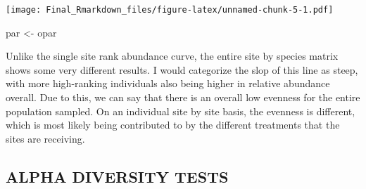 \documentclass[
]{article}
\newenvironment{Shaded}{\begin{snugshade}}{\end{snugshade}}
\newcommand{\NormalTok}[1]{#1}
\newcommand{\OtherTok}[1]{\textcolor[rgb]{0.56,0.35,0.01}{#1}}
\begin{document}
\texttt{[image: Final\_Rmarkdown\_files/figure-latex/unnamed-chunk-5-1.pdf]}

\begin{Shaded}
\begin{Highlighting}[]
\NormalTok{par }\OtherTok{\textless{}{-}}\NormalTok{ opar}
\end{Highlighting}
\end{Shaded}

Unlike the single site rank abundance curve, the entire site by species
matrix shows some very different results. I would categorize the slop of
this line as steep, with more high-ranking individuals also being higher
in relative abundance overall. Due to this, we can say that there is an
overall low evenness for the entire population sampled. On an individual
site by site basis, the evenness is different, which is most likely
being contributed to by the different treatments that the sites are
receiving.

\hypertarget{alpha-diversity-tests}{%
\subsection{ALPHA DIVERSITY TESTS}\label{alpha-diversity-tests}}
\end{document}
